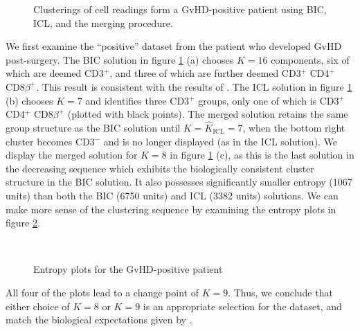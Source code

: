 \documentclass{uwstat572}
\newcommand*\estim[1]{\widehat{#1}}
\renewcommand\;{\,}
\begin{document}
\begin{figure}
\begin{center}
\end{center}
\caption{Clusterings of cell readings form a GvHD-positive patient using BIC, ICL, and the merging procedure.}
\label{positive}
\end{figure}

We first examine the ``positive'' dataset from the patient who developed GvHD post-surgery.
The BIC solution in figure \ref{positive} (a) chooses $K = 16$ components, six of which are deemed CD3$^+$, and three of which are further deemed CD3$^+$ CD4$^+$ CD8$\beta^+$.
This result is consistent with the results of \cite{Brinkman07}.
The ICL solution in figure \ref{positive} (b) chooses $K = 7$ and identifies three CD3$^+$ groups, only one of which is CD3$^+$ CD4$^+$ CD8$\beta^+$ (plotted with black points).
The merged solution retains the same group structure as the BIC solution until $K = \estim K_\text{ICL} = 7$, when the bottom right cluster becomes CD3$^-$ and is no longer displayed (as in the ICL solution).
We display the merged solution for $K = 8$ in figure \ref{positive} (c), as this is the last solution in the decreasing sequence which exhibits the biologically consistent cluster structure in the BIC solution.
It also possesses significantly smaller entropy (1067 units) than both the BIC (6750 units) and ICL (3382 units) solutions.
We can make more sense of the clustering sequence by examining the entropy plots in figure \ref{Entropy5_1}.
\begin{figure}
\begin{center}
\\
\end{center}
\caption{Entropy plots for the GvHD-positive patient}
\label{Entropy5_1}
\end{figure}
All four of the plots lead to a change point of $K = 9$.
Thus, we conclude that either choice of $K = 8$ or $K = 9$ is an appropriate selection for the dataset, and match the biological expectations given by \cite{Brinkman07}.
\end{document}
